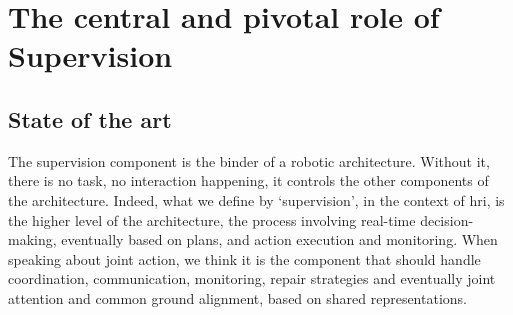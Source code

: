 \documentclass[a4paper,11pt,twoside]{StyleThese}
\begin{document}
	\setcounter{chapter}{3} %
	\dominitoc
	\faketableofcontents
	\fi
	
	
\chapter{The central and pivotal role of Supervision}\label{chapter:chap4}
\minitoc
\section{State of the art}\label{chap4:subsec:state_art_sup}
The supervision component is the binder of a robotic architecture. Without it, there is no task, no interaction happening, it controls the other components of the architecture. Indeed, what we define by `supervision', in the context of \acrshort{hri}, is the higher level of the architecture, the process involving real-time decision-making, eventually based on plans, and action execution and monitoring. When speaking about joint action, we think it is the component that should handle coordination, communication, monitoring, repair strategies and eventually joint attention and common ground alignment, based on shared representations.
\end{document}
